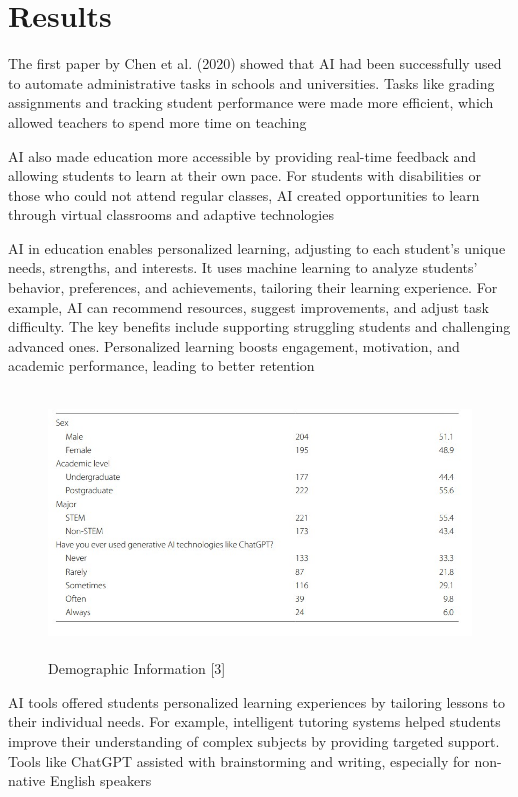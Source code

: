 \documentclass[conference]{IEEEtran}
\begin{document}
\section{Results}
The first paper by Chen et al. (2020) showed that AI had been successfully used to automate administrative tasks in schools and universities. Tasks like grading assignments and tracking student performance were made more efficient, which allowed teachers to spend more time on teaching \cite{r1}

AI also made education more accessible by providing real-time feedback and allowing students to learn at their own pace. For students with disabilities or those who could not attend regular classes, AI created opportunities to learn through virtual classrooms and adaptive technologies \cite{r10}

AI in education enables personalized learning, adjusting to each student’s unique
needs, strengths, and interests. It uses machine learning to analyze students’ behavior,
preferences, and achievements, tailoring their learning experience. For example, AI can
recommend resources, suggest improvements, and adjust task difficulty. The key benefits include supporting struggling students and challenging advanced ones. Personalized
learning boosts engagement, motivation, and academic performance, leading to better retention

\begin{figure}[h]
    \centering
    \includegraphics[height= 7cm, width=\linewidth]{picture_3.jpg}
    \caption{ Demographic Information [3]}
    \label{fig:enter-label}
\end{figure}

AI tools offered students personalized learning experiences by tailoring lessons to their individual needs. For example, intelligent tutoring systems helped students improve their understanding of complex subjects by providing targeted support. Tools like ChatGPT assisted with brainstorming and writing, especially for non-native English speakers \cite{r3} \cite{r9}
\end{document}
